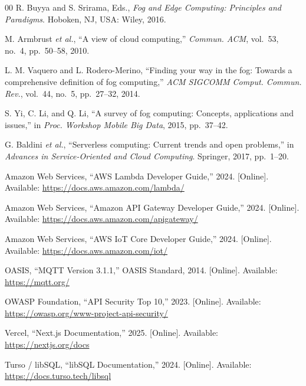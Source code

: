 \documentclass[conference]{IEEEtran}
\begin{document}
\begin{thebibliography}{00}
R. Buyya and S. Srirama, Eds., \emph{Fog and Edge Computing: Principles and Paradigms}. Hoboken, NJ, USA: Wiley, 2016.

M. Armbrust \emph{et al.}, ``A view of cloud computing,'' \emph{Commun. ACM}, vol.~53, no.~4, pp.~50--58, 2010.

L. M. Vaquero and L. Rodero-Merino, ``Finding your way in the fog: Towards a comprehensive definition of fog computing,'' \emph{ACM SIGCOMM Comput. Commun. Rev.}, vol.~44, no.~5, pp.~27--32, 2014.

S. Yi, C. Li, and Q. Li, ``A survey of fog computing: Concepts, applications and issues,'' in \emph{Proc. Workshop Mobile Big Data}, 2015, pp.~37--42.

G. Baldini \emph{et al.}, ``Serverless computing: Current trends and open problems,'' in \emph{Advances in Service-Oriented and Cloud Computing}. Springer, 2017, pp.~1--20.

Amazon Web Services, ``AWS Lambda Developer Guide,'' 2024. [Online]. Available: \url{https://docs.aws.amazon.com/lambda/}

Amazon Web Services, ``Amazon API Gateway Developer Guide,'' 2024. [Online]. Available: \url{https://docs.aws.amazon.com/apigateway/}

Amazon Web Services, ``AWS IoT Core Developer Guide,'' 2024. [Online]. Available: \url{https://docs.aws.amazon.com/iot/}

OASIS, ``MQTT Version 3.1.1,'' OASIS Standard, 2014. [Online]. Available: \url{https://mqtt.org/}

OWASP Foundation, ``API Security Top 10,'' 2023. [Online]. Available: \url{https://owasp.org/www-project-api-security/}

Vercel, ``Next.js Documentation,'' 2025. [Online]. Available: \url{https://nextjs.org/docs}

Turso / libSQL, ``libSQL Documentation,'' 2024. [Online]. Available: \url{https://docs.turso.tech/libsql}
\end{thebibliography}
\end{document}
